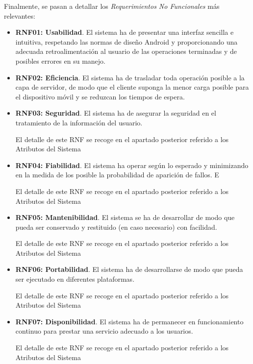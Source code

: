 Finalmente, se pasan a detallar los \emph{Requerimientos No Funcionales} más relevantes:

\begin{itemize}
	\item \textbf{RNF01: Usabilidad}. El sistema ha de presentar una interfaz sencilla e intuitiva, respetando las normas de diseño Android y proporcionando una adecuada retroalimentación al usuario de las operaciones terminadas y de posibles errores en su manejo.
	
	\item \textbf{RNF02: Eficiencia}. El sistema ha de trasladar toda operación posible a la capa de servidor, de modo que el cliente suponga la menor carga posible para el dispositivo móvil y se reduzcan los tiempos de espera.

	
	\item \textbf{RNF03: Seguridad}. El sistema ha de asegurar la seguridad en el tratamiento de la información del usuario. 
	
	El detalle de este RNF se recoge en el apartado posterior referido a los Atributos del Sistema
	
	\item \textbf{RNF04: Fiabilidad}. El sistema ha operar según lo esperado y minimizando en la medida de los posible la probabilidad de aparición de fallos. E
	
	El detalle de este RNF se recoge en el apartado posterior referido a los Atributos del Sistema
	
	\item \textbf{RNF05: Mantenibilidad}. El sistema se ha de desarrollar de modo que pueda ser conservado y restituido (en caso necesario) con facilidad.
	
	El detalle de este RNF se recoge en el apartado posterior referido a los Atributos del Sistema
	
	\item \textbf{RNF06: Portabilidad}. El sistema ha de desarrollarse de modo que pueda ser ejecutado en diferentes plataformas. 
	
	El detalle de este RNF se recoge en el apartado posterior referido a los Atributos del Sistema
	
	\item \textbf{RNF07: Disponibilidad}. El sistema ha de permanecer en funcionamiento continuo para prestar una servicio adecuado a los usuarios.
	
	El detalle de este RNF se recoge en el apartado posterior referido a los Atributos del Sistema
	
\end{itemize}

